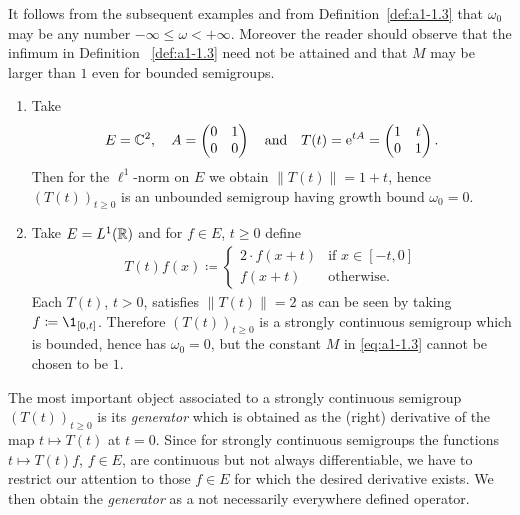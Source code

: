 It follows from the subsequent examples and from Definition~\ref{def:a1-1.3} that $\omega_{0}$ may be any number $ -\infty \leq \omega < +\infty$.
Moreover the reader should observe that the infimum in Definition ~\ref{def:a1-1.3} need not be attained and that $M$ may be larger than $1$ even for bounded semigroups.
\begin{examples}\label{ex:a1-1.4}
\begin{enumerate}[\upshape(i), wide, labelindent=.5em]

\item 
Take 
\[
	E = \mathbb{C}^{2}, \quad
	A = \begin{pmatrix}0 & 1\\0 & 0\end{pmatrix} 
	\quad \text{and} \quad 
	T(t) =  \mathrm{e}^{tA} = \begin{pmatrix}1 & t\\0 & 1\end{pmatrix} .
\]
%
Then for the $\ell^{1}$-norm on $E$ we obtain $\|T(t)\| = 1 + t$, hence $(T(t))_{t\geq0}$ is an unbounded semigroup having growth bound $\omega_{0} = 0$.

\item 
Take $E = L^1(\mathbb{R})$ and for $f \in E$, $t \geq 0$ define
\begin{align*}
T(t)f(x) \coloneqq 
	\begin{cases}
		2\cdot f(x+t) & \text{if } x \in [-t,0] \\
		f(x+t) & \text{otherwise}.
	\end{cases}
\end{align*}
Each $T(t)$, $t > 0$, satisfies $\|T(t)\| = 2$ as can be seen by taking $f \coloneq  \1_{[0,t]}$.
Therefore $(T(t))_{t \geq 0}$ is a strongly continuous semigroup which is bounded, hence has $\omega_{0} = 0$, but the constant $M$ in \eqref{eq:a1-1.3} cannot be chosen to be $1$.

\end{enumerate}
\end{examples}
The most important object associated to a strongly continuous semigroup $(T(t))_{t\geq0}$ is its \emph{generator} which is obtained as the (right) derivative of the map $t \mapsto T(t)$ at $t = 0$.
Since for strongly continuous semigroups the functions $t \mapsto T(t)f$, $f \in E$, are continuous but not always differentiable, we have to restrict our attention to those $f \in E$ for which the desired derivative exists.
We then obtain the \emph{generator} as a not necessarily everywhere defined operator.

